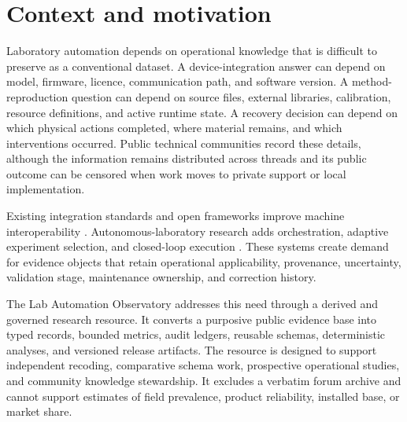 \section{Context and motivation}

Laboratory automation depends on operational knowledge that is difficult to preserve as a conventional dataset. A device-integration answer can depend on model, firmware, licence, communication path, and software version. A method-reproduction question can depend on source files, external libraries, calibration, resource definitions, and active runtime state. A recovery decision can depend on which physical actions completed, where material remains, and which interventions occurred. Public technical communities record these details, although the information remains distributed across threads and its public outcome can be censored when work moves to private support or local implementation.

Existing integration standards and open frameworks improve machine interoperability \cite{bar2012sila,juchli2022sila2,porr2020gateway,bromig2022manager,wierenga2023pylabrobot}. Autonomous-laboratory research adds orchestration, adaptive experiment selection, and closed-loop execution \cite{abolhasani2023rise,hung2024community,canty2023autonomy,fei2024alabos,cousty2024glas}. These systems create demand for evidence objects that retain operational applicability, provenance, uncertainty, validation stage, maintenance ownership, and correction history.

The Lab Automation Observatory addresses this need through a derived and governed research resource. It converts a purposive public evidence base into typed records, bounded metrics, audit ledgers, reusable schemas, deterministic analyses, and versioned release artifacts. The resource is designed to support independent recoding, comparative schema work, prospective operational studies, and community knowledge stewardship. It excludes a verbatim forum archive and cannot support estimates of field prevalence, product reliability, installed base, or market share.
